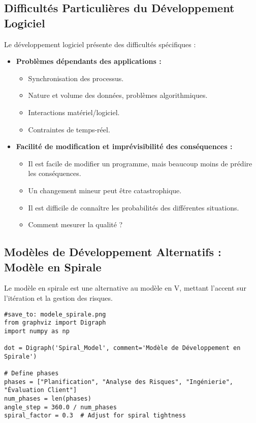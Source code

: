 \documentclass{article}
\begin{document}
\begin{itemize}
\subsection{Difficultés Particulières du Développement Logiciel}

Le développement logiciel présente des difficultés spécifiques :

\begin{itemize}
    \item \textbf{Problèmes dépendants des applications :}
    \begin{itemize}
        \item Synchronisation des processus.
        \item Nature et volume des données, problèmes algorithmiques.
        \item Interactions matériel/logiciel.
        \item Contraintes de temps-réel.
    \end{itemize}
    \item \textbf{Facilité de modification et imprévisibilité des conséquences :}
    \begin{itemize}
        \item Il est facile de modifier un programme, mais beaucoup moins de prédire les conséquences.
        \item Un changement mineur peut être catastrophique.
        \item Il est difficile de connaître les probabilités des différentes situations.
        \item Comment mesurer la qualité ?
    \end{itemize}
\end{itemize}

\subsection{Modèles de Développement Alternatifs : Modèle en Spirale}

Le modèle en spirale est une alternative au modèle en V, mettant l'accent sur l'itération et la gestion des risques.

\begin{verbatim}
#save_to: modele_spirale.png
from graphviz import Digraph
import numpy as np

dot = Digraph('Spiral_Model', comment='Modèle de Développement en Spirale')

# Define phases
phases = ["Planification", "Analyse des Risques", "Ingénierie", "Évaluation Client"]
num_phases = len(phases)
angle_step = 360.0 / num_phases
spiral_factor = 0.3  # Adjust for spiral tightness


\end{verbatim}
\end{itemize}
\end{document}
